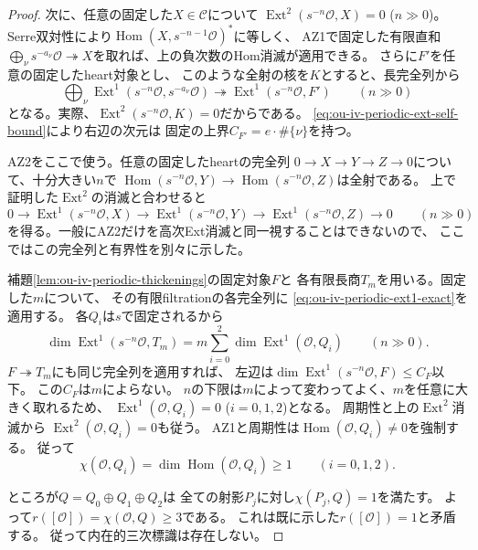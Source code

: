 \begin{proof}
次に、任意の固定した$X\in\mathcal C$について
$\operatorname{Ext}^2(s^{-n}\mathcal O,X)=0$ ($n\gg0$)。
Serre双対性により$\operatorname{Hom}(X,s^{-n-1}\mathcal O)^*$に等しく、
AZ1で固定した有限直和$\bigoplus_\nu s^{-a_\nu}\mathcal O
\twoheadrightarrow X$を取れば、上の負次数のHom消滅が適用できる。
さらに$F'$を任意の固定したheart対象とし、
このような全射の核を$K$とすると、長完全列から
\[
 \bigoplus_\nu\operatorname{Ext}^1
 (s^{-n}\mathcal O,s^{-a_\nu}\mathcal O)
 \twoheadrightarrow\operatorname{Ext}^1(s^{-n}\mathcal O,F')
 \qquad(n\gg0)
\]
となる。実際、$\operatorname{Ext}^2(s^{-n}\mathcal O,K)=0$だからである。
\eqref{eq:ou-iv-periodic-ext-self-bound}により右辺の次元は
固定の上界$C_{F'}=e\cdot\#\{\nu\}$を持つ。

AZ2をここで使う。任意の固定したheartの完全列
$0\to X\to Y\to Z\to0$について、十分大きい$n$で
$\operatorname{Hom}(s^{-n}\mathcal O,Y)\to
 \operatorname{Hom}(s^{-n}\mathcal O,Z)$は全射である。
上で証明した$\operatorname{Ext}^2$の消滅と合わせると
\begin{equation}\label{eq:ou-iv-periodic-ext1-exact}
 0\to\operatorname{Ext}^1(s^{-n}\mathcal O,X)
 \to\operatorname{Ext}^1(s^{-n}\mathcal O,Y)
 \to\operatorname{Ext}^1(s^{-n}\mathcal O,Z)\to0
 \qquad(n\gg0)
\end{equation}
を得る。一般にAZ2だけを高次Ext消滅と同一視することはできないので、
ここではこの完全列と有界性を別々に示した。

補題\ref{lem:ou-iv-periodic-thickenings}の固定対象$F$と
各有限長商$T_m$を用いる。固定した$m$について、
その有限filtrationの各完全列に
\eqref{eq:ou-iv-periodic-ext1-exact}を適用する。
各$Q_i$は$s$で固定されるから
\[
 \dim\operatorname{Ext}^1(s^{-n}\mathcal O,T_m)
 =m\sum_{i=0}^2\dim\operatorname{Ext}^1(\mathcal O,Q_i)
 \qquad(n\gg0).
\]
$F\twoheadrightarrow T_m$にも同じ完全列を適用すれば、
左辺は$\dim\operatorname{Ext}^1(s^{-n}\mathcal O,F)\leq C_F$以下。
この$C_F$は$m$によらない。
$n$の下限は$m$によって変わってよく、$m$を任意に大きく取れるため、
$\operatorname{Ext}^1(\mathcal O,Q_i)=0$ ($i=0,1,2$)となる。
周期性と上の$\operatorname{Ext}^2$消滅から
$\operatorname{Ext}^2(\mathcal O,Q_i)=0$も従う。
AZ1と周期性は$\operatorname{Hom}(\mathcal O,Q_i)\ne0$を強制する。
従って
\[
 \chi(\mathcal O,Q_i)=\dim\operatorname{Hom}(\mathcal O,Q_i)\geq1
 \qquad (i=0,1,2).
\]

ところが$Q=Q_0\oplus Q_1\oplus Q_2$は
全ての射影$P_j$に対し$\chi(P_j,Q)=1$を満たす。
よって$r([\mathcal O])=\chi(\mathcal O,Q)\geq3$である。
これは既に示した$r([\mathcal O])=1$と矛盾する。
従って内在的三次標識は存在しない。
\end{proof}


